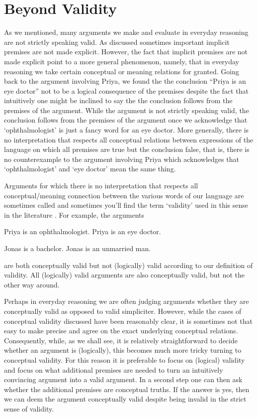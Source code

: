 \section{Beyond Validity}
As we mentioned, many arguments we make and evaluate in everyday reasoning are not strictly speaking valid. As discussed sometimes important implicit premises are not made explicit. However, the fact that implicit premises are not made explicit point to a more general phenomenon, namely, that in everyday reasoning we take certain conceptual or meaning relations for granted. Going back to the argument involving Priya, we found the the conclusion ``Priya is an eye doctor'' not to be a logical consequence of the premises despite the fact that intuitively one might be inclined to say the the conclusion follows from the premises of the argument. While the argument is not strictly speaking valid, the conclusion follows from the premises of the argument once we acknowledge that `ophthalmologist' is just a fancy word for an eye doctor. More generally, there is no interpretation that respects all conceptual relations between expressions of the language on which all premises are true but the conclusion false, that is, there is no counterexample to the argument involving Priya which acknowledges that `ophthalmologist' and `eye doctor' mean the same thing.

Arguments for which there is no interpretation that respects all conceptual/meaning connection between the various words of our language are sometimes called  and sometimes you'll find the term `validity' used in this sense in the literature . For example, the arguments

\begin{earg}
		\prem Priya is an ophthalmologist.
		\conc Priya is an eye doctor.
	\end{earg}

	\begin{earg}
		\prem Jonas is a bachelor.
		\conc Jonas is an unmarried man.
	\end{earg}

	are both conceptually valid but not (logically) valid according to our definition of validity. All (logically) valid arguments are also conceptually valid, but not the other way around.

Perhaps in everyday reasoning we are often judging arguments whether they are conceptually valid as opposed to valid simpliciter. However, while the cases of conceptual validity discussed have been reasonably clear, it is sometimes not that easy to make precise and agree on the exact underlying conceptual relations. Consequently, while, as we shall see, it is relatively straightforward to decide whether an argument is (logically), this becomes much more tricky turning to conceptual validity. For this reason it is preferable to focus on (logical) validity and focus on what additional premises are needed to turn an intuitively convincing argument into a valid argument. In a second step one can then ask whether the additional premises are conceptual truths. If the answer is yes, then we can deem the argument conceptually valid despite being invalid in the strict sense of validity.

